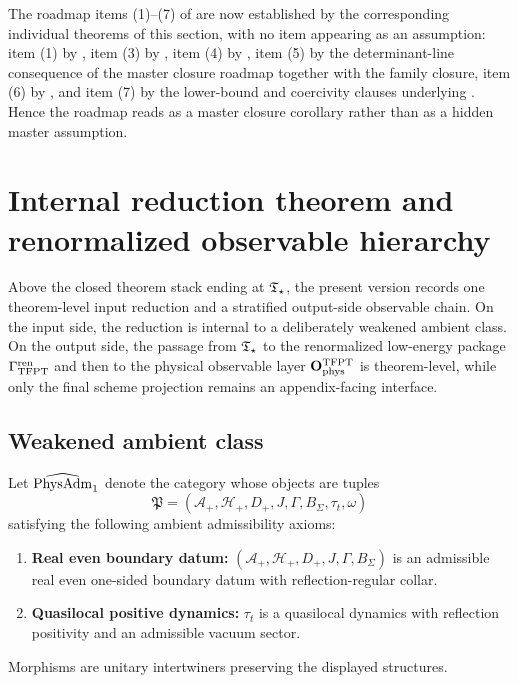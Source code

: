 \begin{corollary}
\label{cor:master-closure-corollary}
The roadmap items (1)--(7) of  are now established by
the corresponding individual theorems of this section, with no item appearing as an assumption:
item (1) by , item (3) by , item (4) by
, item (5) by the determinant-line consequence of the
master closure roadmap together with the family closure, item (6) by
, and item (7) by the lower-bound and coercivity
clauses underlying . Hence the roadmap reads as a
master closure corollary rather than as a hidden master assumption.
\end{corollary}


\section{Internal reduction theorem and renormalized observable hierarchy}
\label{sec:universality-operational}

Above the closed theorem stack ending at $\mathfrak T_{\star}$, the present version records one theorem-level
input reduction and a stratified output-side observable chain. On the input side, the reduction is
internal to a deliberately weakened ambient class. On the output side, the passage from $\mathfrak T_{\star}$ to
the renormalized low-energy package $\Gamma_{\mathrm{TFPT}}^{\mathrm{ren}}$ and then to the physical observable layer
$\mathbf O_{\mathrm{phys}}^{\mathrm{TFPT}}$ is theorem-level, while only the final scheme projection remains an appendix-facing
interface.

\subsection{Weakened ambient class}

\begin{definition}
\label{def:physadm}
Let $\widehat{\mathrm{PhysAdm}}_1$ denote the category whose objects are tuples
\[
\mathfrak P=
(\mathcal A_+,\mathcal H_+,D_+,J,\Gamma,B_\Sigma,\tau_t,\omega)
\]
satisfying the following ambient admissibility axioms:
\begin{enumerate}[leftmargin=2em, topsep=3pt, itemsep=3pt]
    \item[\textbf{(U1)}] \textbf{Real even boundary datum:}
    $(\mathcal A_+,\mathcal H_+,D_+,J,\Gamma,B_\Sigma)$ is an admissible real even one-sided
    boundary datum with reflection-regular collar.
    \item[\textbf{(U4)}] \textbf{Quasilocal positive dynamics:}
    $\tau_t$ is a quasilocal dynamics with reflection positivity and an admissible vacuum sector.
\end{enumerate}
Morphisms are unitary intertwiners preserving the displayed structures.
\end{definition}

